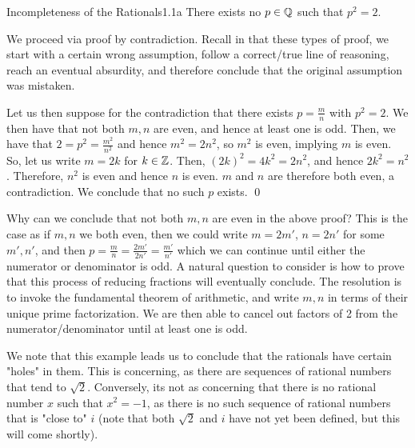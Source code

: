 \begin{example}{Incompleteness of the Rationals}{1.1a}
    There exists no $p \in \mathbb{Q}$ such that $p^2 = 2$.
\end{example}
\noindent We proceed via proof by contradiction. Recall in that these types of proof, we start with a certain wrong assumption, follow a correct/true line of reasoning, reach an eventual absurdity, and therefore conclude that the original assumption was mistaken. 
\begin{nproof}
    Let us then suppose for the contradiction that there exists $p = \frac{m}{n}$ with $p^2 = 2$. We then have that not both $m, n$ are even, and hence at least one is odd. Then, we have that $2 = p^2 = \frac{m^2}{n^2}$ and hence $m^2 = 2n^2$, so $m^2$ is even, implying $m$ is even. So, let us write $m = 2k$ for $k \in \mathbb{Z}$. Then, $(2k)^2 = 4k^2 = 2n^2$, and hence $2k^2 = n^2$. Therefore, $n^2$ is even and hence $n$ is even. $m$ and $n$ are therefore both even, a contradiction. We conclude that no such $p$ exists. \qed
\end{nproof}
\noindent Why can we conclude that not both $m, n$ are even in the above proof? This is the case as if $m, n$ we both even, then we could write $m = 2m'$, $n = 2n'$ for some $m', n'$, and then $p = \frac{m}{n} = \frac{2m'}{2n'} = \frac{m'}{n'}$ which we can continue until either the numerator or denominator is odd. A natural question to consider is how to prove that this process of reducing fractions will eventually conclude. The resolution is to invoke the fundamental theorem of arithmetic, and write $m, n$ in terms of their unique prime factorization. We are then able to cancel out factors of 2 from the numerator/denominator until at least one is odd.

We note that this example leads us to conclude that the rationals have certain "holes" in them. This is concerning, as there are sequences of rational numbers that tend to $\sqrt{2}$. Conversely, its not as concerning that there is no rational number $x$ such that $x^2 = -1$, as there is no such sequence of rational numbers that is "close to" $i$ (note that both $\sqrt{2}$ and $i$ have not yet been defined, but this will come shortly).

\setcounter{rudin}{0}

